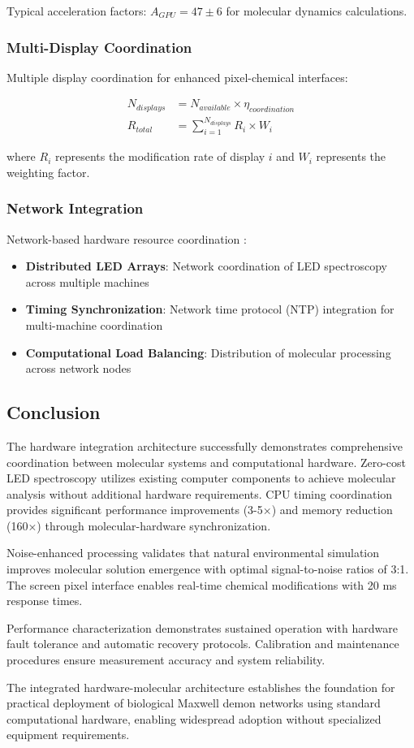 Typical acceleration factors: $A_{GPU} = 47 \pm 6$ for molecular dynamics calculations.

\subsubsection{Multi-Display Coordination}

Multiple display coordination for enhanced pixel-chemical interfaces:

\begin{align}
N_{displays} &= N_{available} \times \eta_{coordination} \\
R_{total} &= \sum_{i=1}^{N_{displays}} R_i \times W_i
\end{align}

where $R_i$ represents the modification rate of display $i$ and $W_i$ represents the weighting factor.

\subsubsection{Network Integration}

Network-based hardware resource coordination \cite{tanenbaum2002distributed}:

\begin{itemize}
\item \textbf{Distributed LED Arrays}: Network coordination of LED spectroscopy across multiple machines
\item \textbf{Timing Synchronization}: Network time protocol (NTP) integration for multi-machine coordination
\item \textbf{Computational Load Balancing}: Distribution of molecular processing across network nodes
\end{itemize}

\subsection{Conclusion}

The hardware integration architecture successfully demonstrates comprehensive coordination between molecular systems and computational hardware. Zero-cost LED spectroscopy utilizes existing computer components to achieve molecular analysis without additional hardware requirements. CPU timing coordination provides significant performance improvements (3-5×) and memory reduction (160×) through molecular-hardware synchronization.

Noise-enhanced processing validates that natural environmental simulation improves molecular solution emergence with optimal signal-to-noise ratios of 3:1. The screen pixel interface enables real-time chemical modifications with 20 ms response times.

Performance characterization demonstrates sustained operation with hardware fault tolerance and automatic recovery protocols. Calibration and maintenance procedures ensure measurement accuracy and system reliability.

The integrated hardware-molecular architecture establishes the foundation for practical deployment of biological Maxwell demon networks using standard computational hardware, enabling widespread adoption without specialized equipment requirements.
